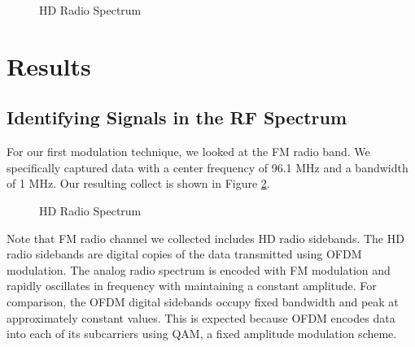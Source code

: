 \documentclass{article}
\begin{document}
\begin{figure}[H]
	\centerline{}
	\caption{HD Radio Spectrum}
	\label{fig::sweeping_the_spectrum}
\end{figure}

\section{Results}


\subsection{Identifying Signals in the RF Spectrum}

For our first modulation technique, we looked at the FM radio band. We specifically captured data with a center frequency of 96.1 MHz and a bandwidth of 1 MHz. Our resulting collect is shown in Figure \ref{fig::hd_radio_spectrum}.

\begin{figure}[H]
	\centerline{}
	\caption{HD Radio Spectrum}
	\label{fig::hd_radio_spectrum}
\end{figure}

Note that FM radio channel we collected includes HD radio sidebands. The HD radio sidebands are digital copies of the data transmitted using OFDM modulation. The analog radio spectrum is encoded with FM modulation and rapidly oscillates in frequency with maintaining a constant amplitude. For comparison, the OFDM digital sidebands occupy fixed bandwidth and peak at approximately constant values. This is expected because OFDM encodes data into each of its subcarriers using QAM, a fixed amplitude modulation scheme. 
\end{document}
